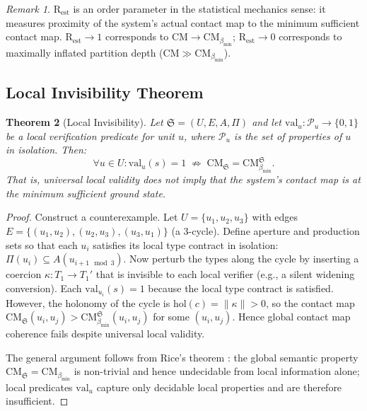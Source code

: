 \documentclass[12pt,a4paper,twocolumn]{article}
\theoremstyle{plain}
\newtheorem{theorem}{Theorem}[section]
\theoremstyle{definition}
\theoremstyle{remark}
\newtheorem{remark}[theorem]{Remark}
\newcommand{\CM}{\mathrm{CM}}
\newcommand{\bmin}{\beta_{\min}}
\newcommand{\Rest}{\mathrm{R}_{\mathrm{est}}}
\newcommand{\CMbmin}{\CM_{\bmin}}
\newcommand{\hol}{\mathrm{hol}}
\newcommand{\val}{\mathrm{val}}
\begin{document}
\begin{remark}
$\Rest$ is an order parameter in the statistical mechanics sense: it measures
proximity of the system's actual contact map to the minimum sufficient contact
map.  $\Rest \to 1$ corresponds to $\CM \to \CMbmin$; $\Rest \to 0$
corresponds to maximally inflated partition depth ($\CM \gg \CMbmin$).
\end{remark}

\subsection{Local Invisibility Theorem}

\begin{theorem}[Local Invisibility]
\label{thm:local-invisibility}
Let $\mathfrak{S} = (U, E, A, \Pi)$ and let $\val_u : \mathcal{P}_u \to
\{0,1\}$ be a local verification predicate for unit $u$, where $\mathcal{P}_u$
is the set of properties of $u$ in isolation.  Then:
\begin{equation}
  \forall u \in U : \val_u(s) = 1 \;\not\Rightarrow\;
    \CM_\mathfrak{S} = \CMbmin^\mathfrak{S}.
\end{equation}
That is, universal local validity does not imply that the system's contact
map is at the minimum sufficient ground state.
\end{theorem}

\begin{proof}
Construct a counterexample.  Let $U = \{u_1, u_2, u_3\}$ with edges
$E = \{(u_1,u_2),(u_2,u_3),(u_3,u_1)\}$ (a 3-cycle).  Define aperture and
production sets so that each $u_i$ satisfies its local type contract in
isolation: $\Pi(u_i) \subseteq A(u_{i+1 \mod 3})$.  Now perturb the types
along the cycle by inserting a coercion $\kappa : T_1 \to T_1'$ that is
invisible to each local verifier (e.g., a silent widening conversion).  Each
$\val_{u_i}(s) = 1$ because the local type contract is satisfied.  However,
the holonomy of the cycle is $\hol(c) = \|\kappa\| > 0$, so the contact map
$\CM_\mathfrak{S}(u_i, u_j) > \CMbmin^\mathfrak{S}(u_i, u_j)$ for some
$(u_i,u_j)$.  Hence global contact map coherence fails despite universal
local validity.

The general argument follows from Rice's theorem \citep{rice1953classes}:
the global semantic property $\CM_\mathfrak{S} = \CMbmin$ is non-trivial and
hence undecidable from local information alone; local predicates $\val_u$
capture only decidable local properties and are therefore insufficient.
\end{proof}
\end{document}
